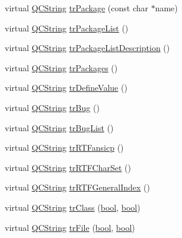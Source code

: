 \begin{DoxyCompactItemize}
\item 
virtual \hyperlink{class_q_c_string}{Q\+C\+String} \hyperlink{class_translator_japanese_afd3280d43c7c68278671b3084b05bf72}{tr\+Package} (const char $\ast$name)
\item 
virtual \hyperlink{class_q_c_string}{Q\+C\+String} \hyperlink{class_translator_japanese_ae510018bf6da333f8e7e35459a99c42c}{tr\+Package\+List} ()
\item 
virtual \hyperlink{class_q_c_string}{Q\+C\+String} \hyperlink{class_translator_japanese_afed2a6851ca809632d284d331ea0c4e3}{tr\+Package\+List\+Description} ()
\item 
virtual \hyperlink{class_q_c_string}{Q\+C\+String} \hyperlink{class_translator_japanese_a4c78ec3aba82e4e5c12bab8f6da15311}{tr\+Packages} ()
\item 
virtual \hyperlink{class_q_c_string}{Q\+C\+String} \hyperlink{class_translator_japanese_a5a68d01de2ed6ab1c5a37596bf7e395d}{tr\+Define\+Value} ()
\item 
virtual \hyperlink{class_q_c_string}{Q\+C\+String} \hyperlink{class_translator_japanese_aefc77d8dc5d731929a925a885f2167ea}{tr\+Bug} ()
\item 
virtual \hyperlink{class_q_c_string}{Q\+C\+String} \hyperlink{class_translator_japanese_a75db1decf69567f638257057f071dd16}{tr\+Bug\+List} ()
\item 
virtual \hyperlink{class_q_c_string}{Q\+C\+String} \hyperlink{class_translator_japanese_a1d3e75d8d22d0d3f04acd4339bba931d}{tr\+R\+T\+Fansicp} ()
\item 
virtual \hyperlink{class_q_c_string}{Q\+C\+String} \hyperlink{class_translator_japanese_a4a63767c84738f67dec5afa48da40760}{tr\+R\+T\+F\+Char\+Set} ()
\item 
virtual \hyperlink{class_q_c_string}{Q\+C\+String} \hyperlink{class_translator_japanese_a077e2e41ece9d5eb8f1312d4acb535f3}{tr\+R\+T\+F\+General\+Index} ()
\item 
virtual \hyperlink{class_q_c_string}{Q\+C\+String} \hyperlink{class_translator_japanese_aa06bfdcdbfe8c2b59abbbb754a9598fe}{tr\+Class} (\hyperlink{qglobal_8h_a1062901a7428fdd9c7f180f5e01ea056}{bool}, \hyperlink{qglobal_8h_a1062901a7428fdd9c7f180f5e01ea056}{bool})
\item 
virtual \hyperlink{class_q_c_string}{Q\+C\+String} \hyperlink{class_translator_japanese_ac66c7700778f3d1409d2670c9123e55e}{tr\+File} (\hyperlink{qglobal_8h_a1062901a7428fdd9c7f180f5e01ea056}{bool}, \hyperlink{qglobal_8h_a1062901a7428fdd9c7f180f5e01ea056}{bool})
\item 

\end{DoxyCompactItemize}
